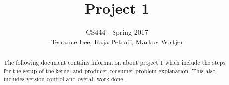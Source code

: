 \documentclass[draftclsnofoot,onecolumn,10pt,compsoc]{IEEEtran}
\begin{document}
\begin{titlepage}
\title{Project 1}
\author{CS444 - Spring 2017 \\ Terrance Lee, Raja Petroff, Markus Woltjer}
\maketitle
\begin{abstract}
The following document contains information about project 1 which include the steps for the setup of the kernel and producer-consumer problem explanation.  This also includes version control and overall work done.  
\end{abstract}

\thispagestyle{empty} %

\end{titlepage}

\tableofcontents

\newpage
\end{document}
